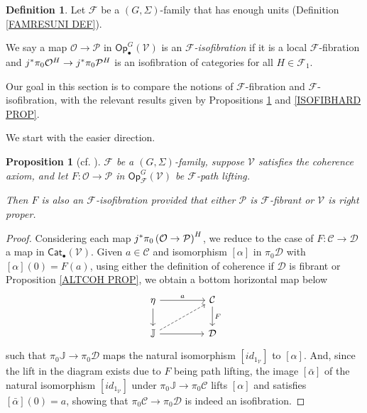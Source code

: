 \documentclass[a4paper,10pt
 ,final
]{article}%
\numberwithin{equation}{section}
\numberwithin{figure}{section}
\newtheorem{proposition}[equation]{Proposition}%
\theoremstyle{definition} %
\newtheorem{definition}[equation]{Definition}%
\newcommand{\Op}{\mathsf{Op}}%
\newcommand{\F}{\ensuremath{\mathcal F}}
\newcommand{\V}{\ensuremath{\mathcal V}}
\renewcommand{\O}{\ensuremath{\mathcal O}}
\renewcommand{\P}{\ensuremath{\mathcal P}}
\newcommand{\1}{\ensuremath{\mathbbm 1}}%
\begin{document}
\begin{definition}
	Let $\F$ be a $(G,\Sigma)$-family that has enough units
	(Definition \ref{FAMRESUNI DEF}).
	
	We say a map $\O \to \P$ in $\Op_\bullet^G(\V)$ is an \textit{$\F$-isofibration} if
	it is a local $\F$-fibration and
	$j^{\**}\pi_0 \O^H \to j^{\**}\pi_0\P^H$
	is an isofibration of categories for all $H \in \F_1$.
\end{definition}


Our goal in this section is to compare the 
notions of $\F$-fibration and $\F$-isofibration,
with the relevant results given by Propositions \ref{ISOFIBEASY PROP} and \ref{ISOFIBHARD PROP}.

We start with the easier direction.


\begin{proposition}[{cf. \cite[Prop. 2.3]{Ber07b}}]
	\label{ISOFIBEASY PROP}
	$\F$ be a $(G,\Sigma)$-family, 
	suppose $\V$ satisfies the coherence axiom,
	and let 
	$F: \O \to \P$ in $\Op^G_\F(\V)$
	be $\F$-path lifting.
	
	Then $F$ is also an $\F$-isofibration
	provided that either $\mathcal{P}$ is $\F$-fibrant
	or $\V$ is right proper.
\end{proposition}


\begin{proof}
	Considering each map 
	$j^{\**} \pi_0\left(\O \to \P \right)^H$,
	we reduce to 
	the case of $F \colon \mathcal{C} \to \mathcal{D}$
	a map in $\mathsf{Cat}_{\bullet} (\V)$.
	Given $a \in \mathcal{C}$
	and isomorphism $[\alpha]$ in $\pi_0 \mathcal{D}$
	with $[\alpha](0)=F(a)$,
	using either the definition of coherence 
	if $\mathcal{D}$ is fibrant or 
	Proposition \ref{ALTCOH PROP},
	we obtain a bottom horizontal map below 
	\begin{equation}
	\begin{tikzcd}[column sep = 45pt]
	\eta \ar{d} \ar{r}{a}
	&
	\mathcal{C} \ar{d}{F}
	\\
	\mathbb{J} \ar{r} \ar[dashed]{ru}
	&
	\mathcal{D}
	\end{tikzcd}
	\end{equation}
	such that $\pi_0 \mathbb{J} \to \pi_0\mathcal{D}$
	maps the natural isomorphism $[id_{1_{\V}}]$ to $[\alpha]$.
	And,
	since the lift in the diagram exists due to $F$ being path lifting,
	the image $[\bar{\alpha}]$
	of the natural isomorphism $[id_{1_{\V}}]$
	under $\pi_0 \mathbb{J} \to \pi_0\mathcal{C}$
	lifts $[\alpha]$
	and satisfies $[\bar{\alpha}](0) = a$,
	showing that
	$\pi_0 \mathcal{C} \to \pi_0 \mathcal{D}$
	is indeed an isofibration.
\end{proof}
\end{document}
